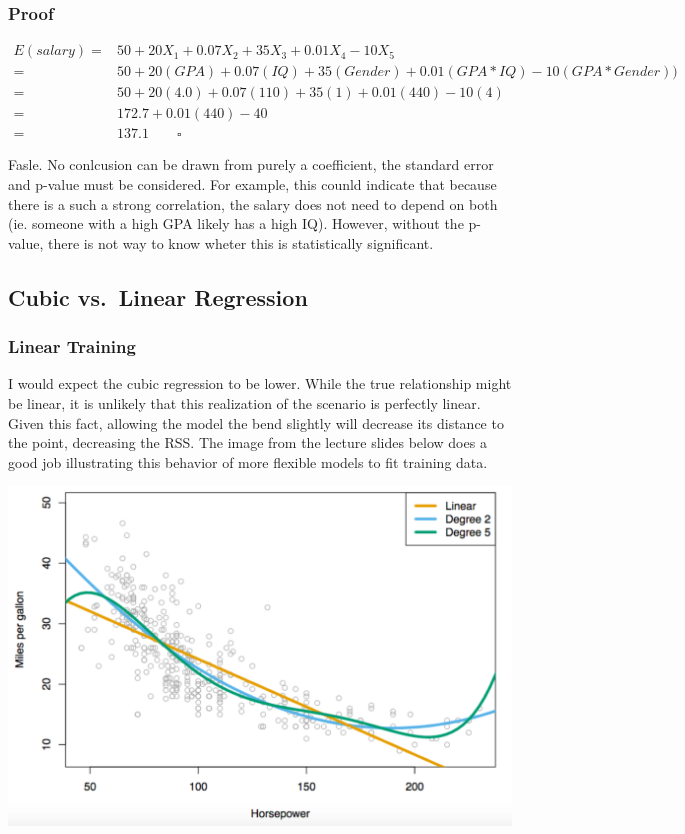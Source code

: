 \documentclass[11pt]{article}
\makeatletter
\def\maxwidth{\ifdim\Gin@nat@width>\linewidth\linewidth
    \else\Gin@nat@width\fi}
\let\Oldincludegraphics\includegraphics
\renewcommand{\includegraphics}[1]{\Oldincludegraphics[width=.8\maxwidth]{#1}}
\makeatother
\begin{document}
    \subsubsection{Proof}\label{proof}

\begin{align}
E(salary) =& 50 + 20X_1 + 0.07X_2 + 35X_3 + 0.01X_4 -10X_5\\
=& 50 + 20(GPA) + 0.07(IQ) + 35(Gender) + 0.01(GPA*IQ) - 10(GPA*Gender))\\
=& 50 + 20(4.0) + 0.07(110) + 35(1) + 0.01(440) - 10(4)\\
=& 172.7  + 0.01(440)-40\\
=& 137.1 \qquad \square
\end{align}

    Fasle. No conlcusion can be drawn from purely a coefficient, the
standard error and p-value must be considered. For example, this counld
indicate that because there is a such a strong correlation, the salary
does not need to depend on both (ie. someone with a high GPA likely has
a high IQ). However, without the p-value, there is not way to know
wheter this is statistically significant.

    \subsection{Cubic vs.~Linear
Regression}\label{cubic-vs.linear-regression}

    \subsubsection{Linear Training}\label{linear-training}

I would expect the cubic regression to be lower. While the true
relationship might be linear, it is unlikely that this realization of
the scenario is perfectly linear. Given this fact, allowing the model
the bend slightly will decrease its distance to the point, decreasing
the RSS. The image from the lecture slides below does a good job
illustrating this behavior of more flexible models to fit training data.

\includegraphics{interpolation_example}
\end{document}
